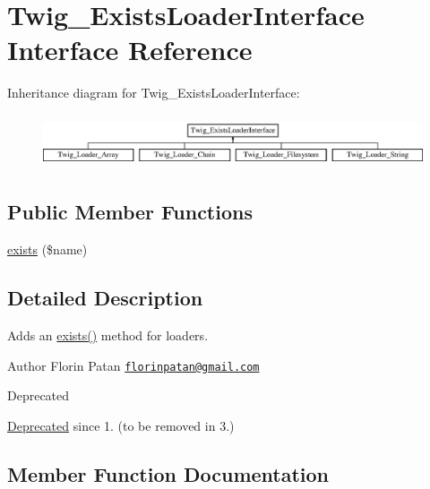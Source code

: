 \hypertarget{interfaceTwig__ExistsLoaderInterface}{}\section{Twig\+\_\+\+Exists\+Loader\+Interface Interface Reference}
\label{interfaceTwig__ExistsLoaderInterface}
Inheritance diagram for Twig\+\_\+\+Exists\+Loader\+Interface\+:\begin{figure}[H]
\begin{center}
\leavevmode
\includegraphics[height=1.600000cm]{interfaceTwig__ExistsLoaderInterface}
\end{center}
\end{figure}
\subsection*{Public Member Functions}
\begin{DoxyCompactItemize}
\item 
\hyperlink{interfaceTwig__ExistsLoaderInterface_acbf436dcf2af2a8179abd8bd0266b24d}{exists} (\$name)
\end{DoxyCompactItemize}


\subsection{Detailed Description}
Adds an \hyperlink{interfaceTwig__ExistsLoaderInterface_acbf436dcf2af2a8179abd8bd0266b24d}{exists()} method for loaders.

\begin{DoxyAuthor}{Author}
Florin Patan \href{mailto:florinpatan@gmail.com}{\tt florinpatan@gmail.\+com}
\end{DoxyAuthor}
\begin{DoxyRefDesc}{Deprecated}
\item[\hyperlink{deprecated__deprecated000012}{Deprecated}]since 1. (to be removed in 3.) \end{DoxyRefDesc}


\subsection{Member Function Documentation}
